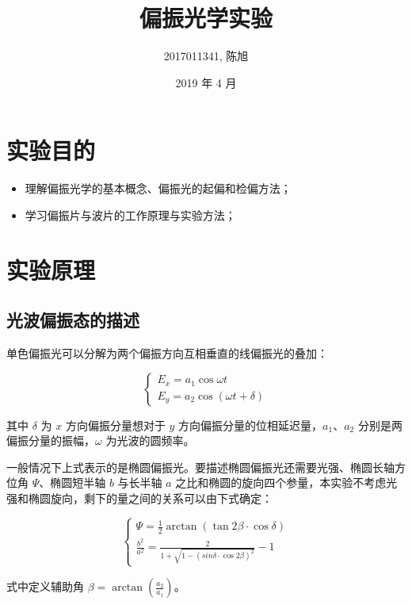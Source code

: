 \documentclass[a4paper]{article}
\title{偏振光学实验}
\author{2017011341, 陈旭}
\date{2019 年 4 月}
\begin{document}
\maketitle

\section{实验目的}

\begin{itemize}
	\item 理解偏振光学的基本概念、偏振光的起偏和检偏方法；
	\item 学习偏振片与波片的工作原理与实验方法；
\end{itemize}

\section{实验原理}

\subsection{光波偏振态的描述}

\par 单色偏振光可以分解为两个偏振方向互相垂直的线偏振光的叠加：

\[
\left\{
\begin{array}{c}
    E_x=a_1 \cos\omega t \\
    E_y=a_2 \cos(\omega t+\delta)
\end{array}
\right.
\]

\par 其中 $\delta$ 为 $x$ 方向偏振分量想对于 $y$ 方向偏振分量的位相延迟量，$a_1$、$a_2$ 分别是两偏振分量的振幅，$\omega$ 为光波的圆频率。

\par 一般情况下上式表示的是椭圆偏振光。要描述椭圆偏振光还需要光强、椭圆长轴方位角 $\Psi$、椭圆短半轴 $b$ 与长半轴 $a$ 之比和椭圆的旋向四个参量，本实验不考虑光强和椭圆旋向，剩下的量之间的关系可以由下式确定：

\[
\left\{
\begin{array}{l}
    \Psi=\frac{1}{2}\arctan(\tan{2\beta}\cdot\cos\delta)\\
    \frac{b^2}{a^2}=\frac{2}{1+\sqrt{1-(sin\delta\cdot\cos{2\beta})^2}}-1
\end{array}
\right.
\]

\par 式中定义辅助角 $\beta=\arctan(\frac{a_2}{a_1})$。
\end{document}
